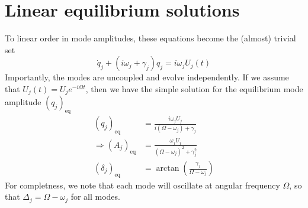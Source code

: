 \section*{Linear equilibrium solutions}

To linear order in mode amplitudes, these equations become the (almost) trivial set
\begin{equation}
\dot{q}_j + (i\omega_j + \gamma_j)q_j = i\omega_j U_j(t)
\end{equation}
Importantly, the modes are uncoupled and evolve independently. If we assume that $U_j(t) = U_j e^{-i\Omega t}$, then we have the simple solution for the equilibrium mode amplitude $(q_j)_{\mathrm{eq}}$
\begin{subequations}
\begin{align}
(q_j)_{\mathrm{eq}} & = \frac{i\omega_j U_j}{i(\Omega - \omega_j) + \gamma_j} \\
\Rightarrow (A_j)_{\mathrm{eq}} & = \frac{\omega_j U_j}{(\Omega - \omega_j)^2 + \gamma_j^2} \\
            (\delta_j)_{\mathrm{eq}} & = \arctan{\left(\frac{\gamma_j}{\Omega - \omega_j}\right)}
\end{align}
\end{subequations}
For completness, we note that each mode will oscillate at angular frequency $\Omega$, so that $\Delta_j = \Omega - \omega_j$ for all modes.

